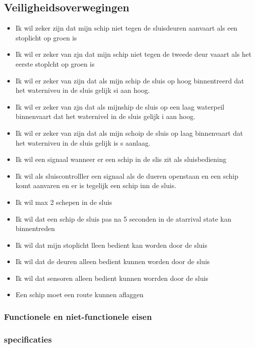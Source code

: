 \subsection{Veiligheidsoverwegingen}
\begin{itemize}
	\item Ik wil zeker zijn dat mijn schip niet tegen de sluisdeuren aanvaart als een stoplicht op groen is
	\item  Ik wil er zeker van zjn dat mijn schip niet tegen de tweede deur vaaart als het eerste stoplcht op groen is
	\item  Ik wil er zeker van zijn dat als mijn schip de sluis op hoog binnentreerd dat het waterniveu in de sluis gelijk si aan hoog.
	\item  Ik wil er zeker van zjn dat als mijnship de sluis op een laag waterpeil binnenvaart dat het waternivel in de sluis gelijk i aan hoog.
	\item  Ik wil er zeker van zijn dat als mijn schoip de sluis op laag binnenvaart dat het waterniveu in de sluis gelijk is s aanlaag.
	\item  Ik wil een signaal wanneer er een schip in de slis zit als sluisbediening
	\item  Ik wil als sluiscontrolller een signaal als de dueren openstaan en een schip komt aanvaren en er is tegelijk een schip inn de sluis.
	\item  Ik wil max 2 schepen in de sluis
	\item  Ik wil dat een schip de sluis pas na 5 seconden in de  atarrival state kan binnentreden
	\item  Ik wil dat mijn stoplicht lleen bedient kan worden door de sluis
	\item  Ik wil dat de deuren alleen bedient kunnen worden door de sluis
	\item  Ik wil dat sensoren alleen bedient kunnen worrden door de sluis
	\item  Een schip moet een route kunnen aflaggen 
\end{itemize}





\subsubsection{Functionele en niet-functionele eisen}

\subsubsection{specificaties}

